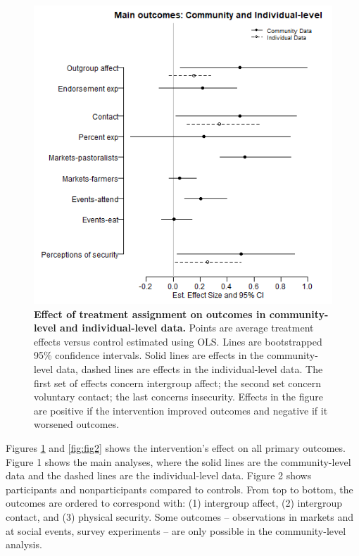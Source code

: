 \documentclass[11pt]{article}
\begin{document}
\begin{figure}[H]
\centering
\includegraphics[width=.7\textwidth]{../../../figs/ecpn_coefplots_MainOuts-cats.png}
\caption{\label{fig:fig1} \textbf{Effect of treatment assignment on outcomes in community-level and individual-level data.} Points are average treatment effects versus control estimated using OLS. Lines are bootstrapped 95\% confidence intervals.  Solid lines are effects in the community-level data, dashed lines are effects in the individual-level data.  The first set of effects concern intergroup affect; the second set concern voluntary contact; the last concerns insecurity.  Effects in the figure are positive if the intervention improved outcomes and negative if it worsened outcomes.}
\end{figure}

Figures \ref{fig:fig1} and \ref{fig:fig2} shows the intervention's
effect on all primary outcomes. Figure 1 shows the main analyses, where
the solid lines are the community-level data and the dashed lines are
the individual-level data. Figure 2 shows participants and
nonparticipants compared to controls. From top to bottom, the outcomes
are ordered to correspond with: (1) intergroup affect, (2) intergroup
contact, and (3) physical security. Some outcomes -- observations in
markets and at social events, survey experiments -- are only possible in
the community-level analysis.
\end{document}
